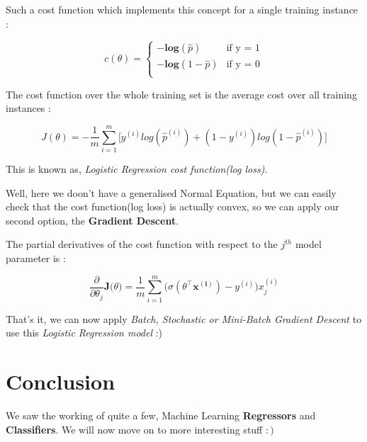 \documentclass[11pt, a4paper]{book}
\begin{document}
Such a cost function which implements this concept for a single training
instance :

\[c(\theta) = \begin{cases} \mathbf{-log}(\hat{p}) & \text{if y = 1}\\ \mathbf{-log}(1-\hat{p}) & \text{if y = 0}\\ \end{cases}\]

The cost function over the whole training set is the average cost over
all training instances :

\[J(\theta) = -\frac{1}{m}\sum_{i=1}^{m} \Big[ y^{(i)}log(\hat{p}^{(i)}) + (1 - y^{(i)})log(1-\hat{p}^{(i)})\Big]\]

This is known as, \emph{Logistic Regression cost function(log loss)}.

Well, here we doon't have a generalised Normal Equation, but we can
easily check that the cost function(log loss) is actually convex, so we
can apply our second option, the \textbf{Gradient Descent}.

The partial derivatives of the cost function with respect to the
\(j^{th}\) model parameter is :

\[\frac{\partial}{\partial \theta_{j}}\mathbf{J(}\theta) = \frac{1}{m} \sum_{i=1}^{m}\Big(\sigma(\theta^{\intercal}\mathbf{x^{(i)}}) - y^{(i)}\Big)x_{j}^{(i)}\]

That's it, we can now apply \emph{Batch, Stochastic or Mini-Batch
Gradient Descent} to use this \emph{Logistic Regression model} :)

    \hypertarget{conclusion}{%
\section{Conclusion}\label{conclusion}}

We saw the working of quite a few, Machine Learning \textbf{Regressors}
and \textbf{Classifiers}. We will now move on to more interesting stuff
\(:)\)


    
    
    
\end{document}
